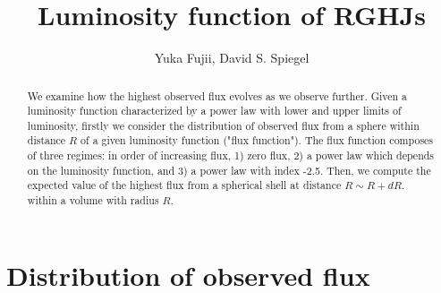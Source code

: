 \documentclass[iop,numberedappendix,apj,twocolappendix,]{emulateapj}
\begin{document}
\renewcommand\bottomfraction{.9}
\newcommand{\PD}[2]{\frac{\partial {#1}}{\partial {#2}}}
\newcommand{\memoYF}[1]{\color{red} #1 \color{black}}

\title{Luminosity function of RGHJs}
\author{%
Yuka Fujii, %
David S. Spiegel%
}


  




\begin{abstract}
We examine how the highest observed flux evolves as we observe further. 
Given a luminosity function characterized by a power law with lower and upper limits of luminosity, firstly we consider the distribution of observed flux from a sphere within distance $R$ of a given luminosity function ("flux function"). The flux function composes of three regimes: in order of increasing flux, 1) zero flux, 2) a power law which depends on the luminosity function, and 3) a power law with index -2.5. 
Then, we compute the expected value of the highest flux from a spherical shell at distance $R\sim R+dR$. within a volume with radius $R$. 
\end{abstract} 


\section{Distribution of observed flux} 
\label{sec:luminosity function}
\end{document}
